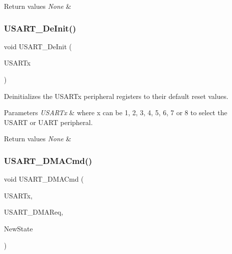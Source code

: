 \begin{DoxyRetVals}{Return values}
{\em None} & \\
\hline
\end{DoxyRetVals}
\mbox{\label{group___u_s_a_r_t_ga2f8e1ce72da21b6539d8e1f299ec3b0d}} 
\subsubsection{\texorpdfstring{U\+S\+A\+R\+T\+\_\+\+De\+Init()}{USART\_DeInit()}}
{\footnotesize\ttfamily void U\+S\+A\+R\+T\+\_\+\+De\+Init (\begin{DoxyParamCaption}\item[{U\+S\+A\+R\+T\+\_\+\+Type\+Def $\ast$}]{U\+S\+A\+R\+Tx }\end{DoxyParamCaption})}



Deinitializes the U\+S\+A\+R\+Tx peripheral registers to their default reset values. 


\begin{DoxyParams}{Parameters}
{\em U\+S\+A\+R\+Tx} & where x can be 1, 2, 3, 4, 5, 6, 7 or 8 to select the U\+S\+A\+RT or U\+A\+RT peripheral. \\
\hline
\end{DoxyParams}

\begin{DoxyRetVals}{Return values}
{\em None} & \\
\hline
\end{DoxyRetVals}
\mbox{\label{group___u_s_a_r_t_ga902857f199ebfba21c63d725354af66f}} 
\subsubsection{\texorpdfstring{U\+S\+A\+R\+T\+\_\+\+D\+M\+A\+Cmd()}{USART\_DMACmd()}}
{\footnotesize\ttfamily void U\+S\+A\+R\+T\+\_\+\+D\+M\+A\+Cmd (\begin{DoxyParamCaption}\item[{U\+S\+A\+R\+T\+\_\+\+Type\+Def $\ast$}]{U\+S\+A\+R\+Tx,  }\item[{uint16\+\_\+t}]{U\+S\+A\+R\+T\+\_\+\+D\+M\+A\+Req,  }\item[{Functional\+State}]{New\+State }\end{DoxyParamCaption})}



